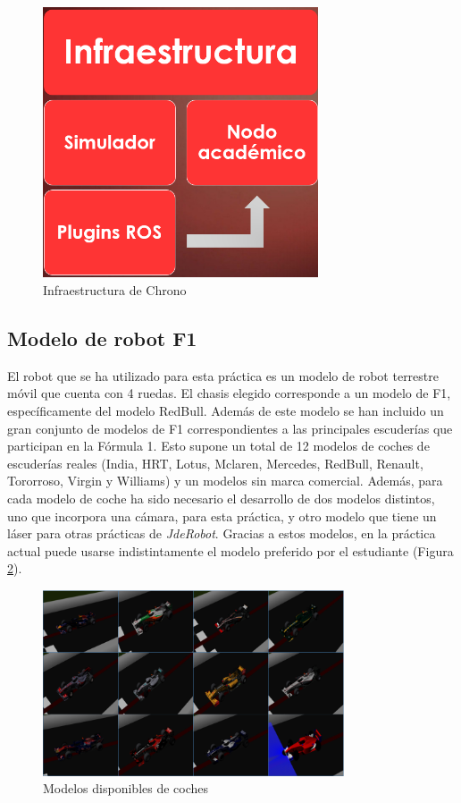 \begin{figure}[H]
  \begin{center}
    \includegraphics[width=0.4\linewidth, height=8cm]{figures/infraestructura_ch.png}
		\caption{Infraestructura de Chrono}
		\label{fig.infraestructura_ch}
		\end{center}
\end{figure}

\subsection{Modelo de robot F1}
El robot que se ha utilizado para esta práctica es un modelo de robot terrestre móvil que cuenta con 4 ruedas. El chasis elegido corresponde a un modelo de F1, específicamente del modelo RedBull. Además de este modelo se han incluido un gran conjunto de modelos de F1 correspondientes a las principales escuderías que participan en la Fórmula 1. Esto supone un total de 12 modelos de coches de escuderías reales (India, HRT, Lotus, Mclaren, Mercedes, RedBull, Renault, Tororroso, Virgin y Williams) y un modelos sin marca comercial. Además, para cada modelo de coche ha sido necesario el desarrollo de dos modelos distintos, uno que incorpora una cámara, para esta práctica, y otro modelo que tiene un láser para otras prácticas de \textit{JdeRobot}. Gracias a estos modelos, en la práctica actual puede usarse indistintamente el modelo preferido por el estudiante (Figura \ref{fig.f1s}).

\begin{figure}[H]
  \begin{center}
    \includegraphics[width=0.99\linewidth, height=5.5cm]{figures/coches.png}
		\caption{Modelos disponibles de coches}
		\label{fig.f1s}
		\end{center}
\end{figure}

